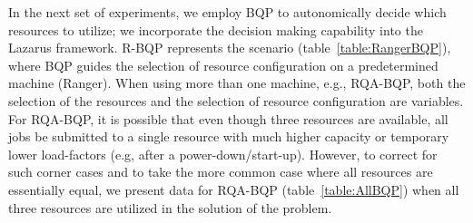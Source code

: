 \documentclass{acm_proc_article-sp}
\begin{document}
\begin{table}
\begin{center}
\vspace{0.2in}
\caption{Table showing the configurations chosen on Ranger, with and
  without BQP. Notice how the use of BQP has a small, but significant
  change in the queue, size and duration
  requested.} \label{table:RangerBQP}

\end{center}
\end{table}

In the next set of experiments, we employ BQP to autonomically decide
which resources to utilize; we incorporate the decision making
capability into the Lazarus framework.  R-BQP represents the scenario
(table~\ref{table:RangerBQP}), where BQP guides the selection of
resource configuration on a predetermined machine (Ranger).  When
using more than one machine, e.g.,
RQA-BQP, %
both the selection of the resources and the selection of resource
configuration are variables. For RQA-BQP, it is possible that even
though three resources are available, all jobs be submitted to a
single resource with much higher capacity or temporary lower
load-factors (e.g, after a power-down/start-up). However, to correct
for such corner cases and to take the more common case where all
resources are essentially equal, we present data for RQA-BQP
(table~\ref{table:AllBQP}) when all three resources are utilized in
the solution of the problem.
\end{document}
